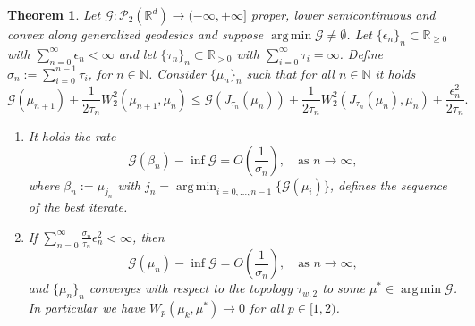\documentclass[11pt]{article}
\DeclareMathOperator*{\argmin}{arg\,min}
\newtheorem{theorem}{Theorem}[section]
\newcommand{\cP}{\mathcal{P}}
\newcommand{\cG}{\mathcal{G}}
\newcommand{\R}{\mathbb{R}}
\newcommand{\N}{\mathbb{N}}
\newcommand{\RR}{(-\infty,+\infty]}
\numberwithin{equation}{section}
\begin{document}
\begin{theorem}\label{thm:second_error_choice}
	Let $\cG : \cP_2(\R^d) \to \RR $ proper, lower semicontinuous and convex along generalized geodesics and suppose $\argmin \cG \neq \emptyset$. Let $\{\epsilon_n\}_n\subset \mathbb{R}_{\geq 0}$ with $\sum_{n=0}^{\infty} \epsilon_n < \infty$ and let $\{\tau_n\}_n \subset \mathbb{R}_{> 0}$ with $\sum_{i=0}^{\infty}\tau_i= \infty$. Define $\sigma_n:= \sum_{i=0}^{n-1}\tau_i$, for $n\in\mathbb{N}$. Consider $\{\mu_n\}_n$ such that for all $n\in \N$ it holds
	\begin{equation}\label{eq:second_error_condition}
		\cG(\mu_{n+1})+\frac{1}{2{\tau_n}}W_2^2(\mu_{n+1},\mu_n)\leq \cG(J_{\tau_n}(\mu_n))+\frac{1}{2\tau_n}W_2^2(J_{\tau_n}(\mu_n),\mu_n)+ \frac{\epsilon_n^2}{2\tau_n}.
	\end{equation}
	\begin{enumerate}
		\item It holds the rate
		\begin{equation*}
			\cG(\beta_n)-\inf \cG = O\left(\frac{1}{\sigma_n}\right), \quad \text{as } n\to \infty,
		\end{equation*}
		where $\beta_n := \mu_{j_n}$ with $j_n = \argmin_{i=0,\dots,n-1}\{\cG(\mu_i)\}$, defines the sequence of the best iterate.
		\item If $\sum_{n=0}^{\infty}\frac{\sigma_n}{\tau_n}\epsilon_{n}^2  < \infty$, then \[\cG(\mu_n)-\inf \cG = O\left(\frac{1}{\sigma_n}\right), \quad \text{as } n\to \infty,\] and $\{\mu_n\}_n$ converges with respect to the topology $\tau_{w,2}$ to some $\mu^*\in \argmin \cG$. In particular we have $W_p(\mu_k,\mu^*)\to 0$ for all $p\in[1,2)$.
	\end{enumerate}
\end{theorem}
\end{document}
